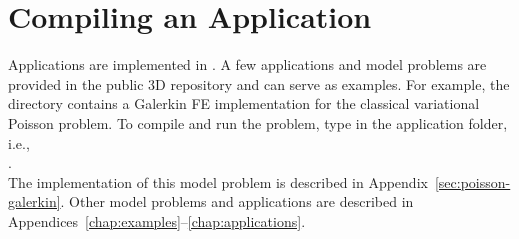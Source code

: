 \section{Compiling an Application}
\label{sec:application}

Applications are implemented in . A few applications and model problems are provided in the public \hp3D repository and can serve as examples. For example, the directory  contains a Galerkin FE implementation for the classical variational Poisson problem. To compile and run the problem, type  in the application folder, i.e.,\\
.\\
The implementation of this model problem is described in Appendix~\ref{sec:poisson-galerkin}. Other model problems and applications are described in Appendices~\ref{chap:examples}--\ref{chap:applications}.

%


